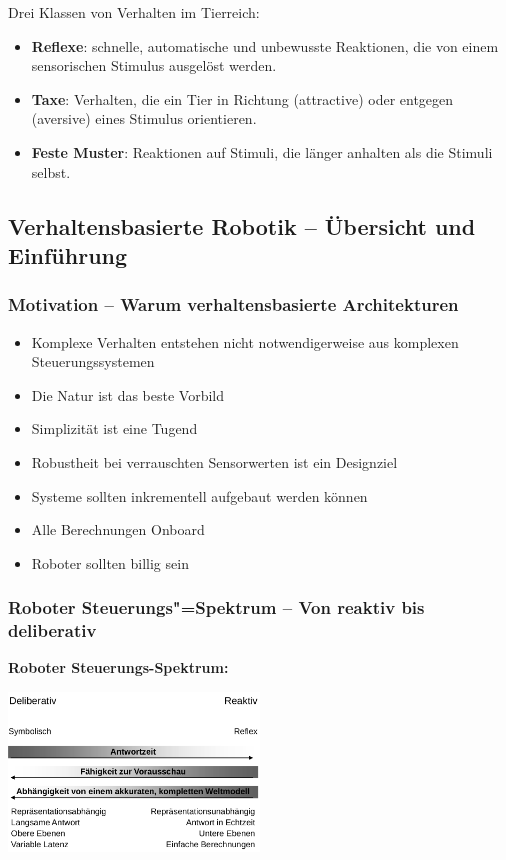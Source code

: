 Drei Klassen von Verhalten im Tierreich:
\begin{itemize}
	\item \textbf{Reflexe}: schnelle, automatische und unbewusste Reaktionen, die von einem sensorischen Stimulus ausgelöst werden.
	\item \textbf{Taxe}: Verhalten, die ein Tier in Richtung (attractive) oder entgegen (aversive) eines Stimulus orientieren.
	\item \textbf{Feste Muster}: Reaktionen auf Stimuli, die länger anhalten als die Stimuli selbst.
\end{itemize}

\subsection{Verhaltensbasierte Robotik -- Übersicht  und Einführung}

\subsubsection{Motivation -- Warum verhaltensbasierte Architekturen}
\begin{itemize}
	\item Komplexe Verhalten entstehen nicht notwendigerweise aus komplexen Steuerungssystemen
	\item Die Natur ist das beste Vorbild
	\item Simplizität ist eine Tugend
	\item Robustheit bei verrauschten Sensorwerten ist ein Designziel
	\item Systeme sollten inkrementell aufgebaut werden können
	\item Alle Berechnungen Onboard
	\item Roboter sollten billig sein
\end{itemize}

\subsubsection{Roboter Steuerungs"=Spektrum -- Von reaktiv bis deliberativ}
\textbf{Roboter Steuerungs-Spektrum:}
\begin{center}
	\includegraphics[width=0.5\textwidth]{figures/steuerungs_spektrum.png}
\end{center}

